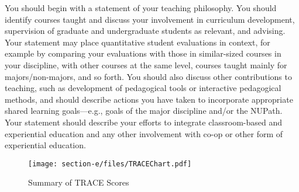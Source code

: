 You should begin with a statement of your teaching philosophy. 
You should identify courses taught and discuss your involvement in curriculum development, supervision of graduate and undergraduate students as relevant, and advising. 
Your statement may place quantitative student evaluations in context, for example by comparing your evaluations with those in similar-sized courses in your discipline, with other courses at the same level, courses taught mainly for majors/non-majors, and so forth. 
You should also discuss other contributions to teaching, such as development of pedagogical tools or interactive pedagogical methods, and should describe actions you have taken to incorporate appropriate shared learning goals—e.g., goals of the major discipline and/or the NUPath. 
Your statement should describe your efforts to integrate classroom-based and experiential education and any other involvement with co-op or other form of experiential education.

\newpage

\begin{landscape}
    \hspace{8.0cm}

    \begin{center}
        \begin{figure}[h!]
            \centerline{\texttt{[image: section-e/files/TRACEChart.pdf]}}
            \caption{Summary of TRACE Scores}
            \label{trace-summary}
        \end{figure}
    \end{center}
\end{landscape}
